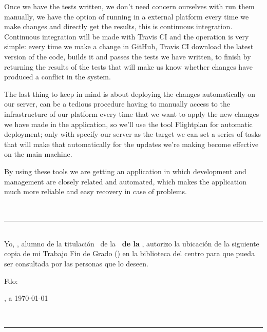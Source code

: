 {\bigskip
Once we have the tests written, we don't need concern ourselves with run them manually, we have the option of running in a
external platform every time we make changes and directly get the results, this is continuous integration. Continuous
integration will be made with Travis CI and the operation is very simple: every time we make a change in GitHub, Travis CI
download the latest version of the code, builds it and passes the tests we have written, to finish by returning the results
of the tests that will make us know whether changes have produced a conflict in the system. 

\bigskip
The last thing to keep in mind is about deploying the changes automatically on our server, can be a tedious procedure having to
manually access to the infrastructure of our platform every time that we want to apply the new changes we have made in the
application, so we'll use the tool Flightplan for automatic deployment; only with specify our server as the target we can set
a series of tasks that will make that automatically for the updates we're making become effective on the main machine.

\bigskip
By using these tools we are getting an application in which development and management are closely related and automated, which
makes the application much more reliable and easy recovery in case of problems.

\newpage
\thispagestyle{empty}
\
\vspace{3cm}

\noindent\rule[-1ex]{\textwidth}{2pt}\\[4.5ex]

Yo, \textbf{\autor}, alumno de la titulación \titulacion\ de la \textbf{\escuela\ de la \universidad}, autorizo la ubicación de
la siguiente copia de mi Trabajo Fin de Grado (\textit{\titulo}) en la biblioteca del centro para que pueda ser consultada por las personas que 
lo deseen.

\vspace{6cm}

\noindent Fdo: \autor

\vspace{2cm}

\begin{flushright}
\ciudad, a \today
\end{flushright}

\newpage
\thispagestyle{empty}
\
\vspace{3cm}

\noindent\rule[-1ex]{\textwidth}{2pt}\\[4.5ex]

}

